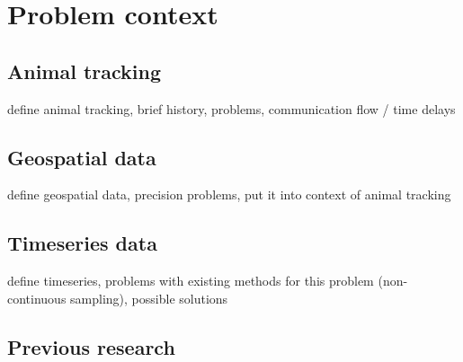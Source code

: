 
\chapter{Problem context}

\section{Animal tracking}

define animal tracking, brief history, problems, communication flow / time delays

\section{Geospatial data}

define geospatial data, precision problems, put it into context of animal tracking

\section{Timeseries data}

define timeseries, problems with existing methods for this problem (non-continuous sampling), possible solutions


\section{Previous research}

